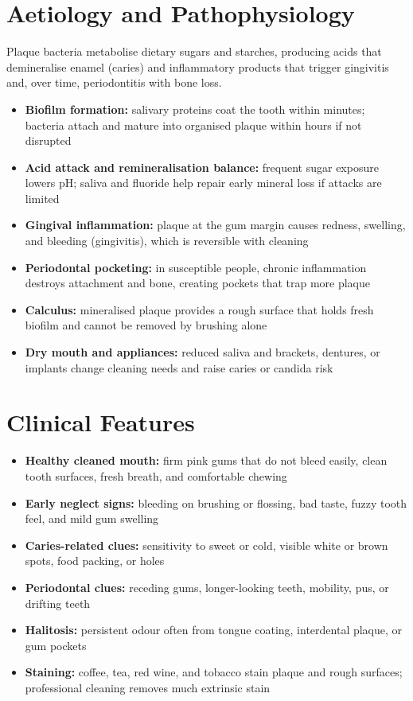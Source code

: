\section*{Aetiology and Pathophysiology}
Plaque bacteria metabolise dietary sugars and starches, producing acids that demineralise enamel (caries) and inflammatory products that trigger gingivitis and, over time, periodontitis with bone loss.

\begin{itemize}
    \item \textbf{Biofilm formation:} salivary proteins coat the tooth within minutes; bacteria attach and mature into organised plaque within hours if not disrupted
    \item \textbf{Acid attack and remineralisation balance:} frequent sugar exposure lowers pH; saliva and fluoride help repair early mineral loss if attacks are limited
    \item \textbf{Gingival inflammation:} plaque at the gum margin causes redness, swelling, and bleeding (gingivitis), which is reversible with cleaning
    \item \textbf{Periodontal pocketing:} in susceptible people, chronic inflammation destroys attachment and bone, creating pockets that trap more plaque
    \item \textbf{Calculus:} mineralised plaque provides a rough surface that holds fresh biofilm and cannot be removed by brushing alone
    \item \textbf{Dry mouth and appliances:} reduced saliva and brackets, dentures, or implants change cleaning needs and raise caries or candida risk
\end{itemize}

\section*{Clinical Features}
\begin{itemize}
    \item \textbf{Healthy cleaned mouth:} firm pink gums that do not bleed easily, clean tooth surfaces, fresh breath, and comfortable chewing
    \item \textbf{Early neglect signs:} bleeding on brushing or flossing, bad taste, fuzzy tooth feel, and mild gum swelling
    \item \textbf{Caries-related clues:} sensitivity to sweet or cold, visible white or brown spots, food packing, or holes
    \item \textbf{Periodontal clues:} receding gums, longer-looking teeth, mobility, pus, or drifting teeth
    \item \textbf{Halitosis:} persistent odour often from tongue coating, interdental plaque, or gum pockets
    \item \textbf{Staining:} coffee, tea, red wine, and tobacco stain plaque and rough surfaces; professional cleaning removes much extrinsic stain
\end{itemize}

